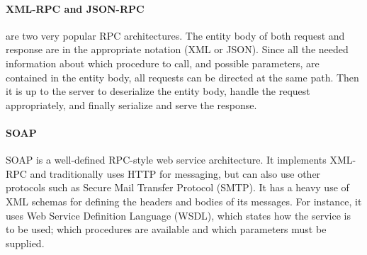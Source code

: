 \paragraph{XML-RPC and JSON-RPC} are two very popular RPC architectures.
The entity body of both request and response are in the appropriate notation (XML or JSON).
Since all the needed information about which procedure to call, and possible parameters, are contained in the entity body, all requests can be directed at the same path.
Then it is up to the server to deserialize the entity body, handle the request appropriately, and finally serialize and serve the response.

\paragraph{SOAP}
SOAP is a well-defined RPC-style web service architecture.
It implements XML-RPC and traditionally uses HTTP for messaging, but can also use other protocols such as Secure Mail Transfer Protocol (SMTP).
It has a heavy use of XML schemas for defining the headers and bodies of its messages.
For instance, it uses Web Service Definition Language (WSDL), which states how the service is to be used; which procedures are available and which parameters must be supplied.
